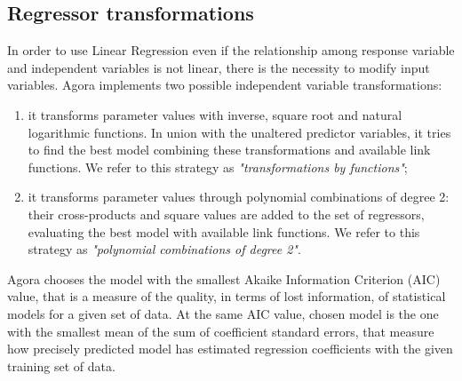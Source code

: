 \subsection{Regressor transformations}\label{regrTransforms}

In order to use Linear Regression even if the relationship among response variable and independent variables is not linear, there is the necessity to modify input variables. Agora implements two possible independent variable transformations:

\begin{enumerate}

    \item it transforms parameter values with inverse, square root and natural logarithmic functions. In union with the unaltered predictor variables, it tries to find the best model combining these transformations and available link functions. We refer to this strategy as \textit{"transformations by functions"};
    
    \item it transforms parameter values through polynomial combinations of degree 2: their cross-products and square values are added to the set of regressors, evaluating the best model with available link functions. We refer to this strategy as \textit{"polynomial combinations of degree 2"}.

\end{enumerate}

Agora chooses the model with the smallest Akaike Information Criterion (AIC) value, that is a measure of the quality, in terms of lost information, of statistical models for a given set of data. At the same AIC value, chosen model is the one with the smallest mean of the sum of coefficient standard errors, that measure how precisely predicted model has estimated regression coefficients with the given training set of data.
